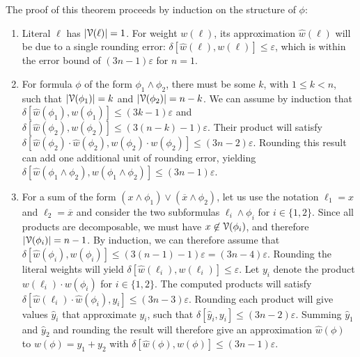 \documentclass[letterpaper,USenglish,cleveref, autoref, thm-restate]{lipics-v2021}
\newcommand{\obar}[1]{\overline{#1}}
\newcommand{\lit}{\ell}
\newcommand{\approximate}[1]{\hat{#1}}
\newcommand{\approxy}{\approximate{y}}
\newcommand{\approxw}{\approximate{w}}
\newcommand{\aerror}{\delta}
\newcommand{\roundepsilon}{\varepsilon}
\newcommand{\dependencyset}{{\cal V}}
\begin{document}
The proof of this theorem proceeds by induction on the structure of $\phi$:
\begin{enumerate}
\item Literal $\lit$ has $|\dependencyset(\lit)| = 1$.  For weight $w(\lit)$, its approximation $\approxw(\lit)$ will be due to a single rounding error:
$\aerror[\approxw(\lit), w(\lit)] \leq \roundepsilon$, which is within the error bound of $(3n-1)\roundepsilon$ for $n=1$.
\item For formula $\phi$ of the form $\phi_1 \land \phi_2$, there must be some $k$, with $1 \leq k < n$, such that $|\dependencyset(\phi_1)| = k$
  and $|\dependencyset(\phi_2)| = n-k$.  We can assume by induction that 
$\aerror[\approxw(\phi_1), w(\phi_1)] \leq (3 k-1) \roundepsilon$
  and $\aerror[\approxw(\phi_2), w(\phi_2)] \leq (3 (n-k)-1) \roundepsilon$.  Their product
  will satisfy 
  $\aerror[\approxw(\phi_2) \cdot \approxw(\phi_2), w(\phi_2) \cdot w(\phi_2)] \leq (3 n -2) \roundepsilon$.
  Rounding this result can add one additional unit of rounding error, yielding
$\aerror[\approxw(\phi_1 \land \phi_2), w(\phi_1 \land \phi_2)] \leq (3 n -1) \roundepsilon$.
\item For a sum of the form
  $(x \land \phi_1) \lor (\obar{x} \land \phi_2)$, let us use the notation $\lit_1 = x$ and $\lit_2 = \obar{x}$
  and consider the two subformulas $\lit_i \land \phi_i$ for $i \in \{1,2\}$.
  Since all products are decomposable, we must have $x \not \in \dependencyset(\phi_i)$,
  and therefore $|\dependencyset(\phi_i)| = n-1$.
  By induction, we can therefore assume that
  $\aerror[\approxw(\phi_i), w(\phi_i)] \leq (3(n-1)-1) \roundepsilon = (3n-4)\roundepsilon$.  Rounding the literal weights will yield
  $\aerror[\approxw(\lit_i), w(\lit_i)] \leq \roundepsilon$.  Let $y_i$ denote the product $w(\lit_i) \cdot w(\phi_i)$ for $i \in \{1,2\}$.
  The computed products will satisfy
  $\aerror[\approxw(\lit_i) \cdot \approxw(\phi_i), y_i] \leq (3n-3) \roundepsilon$.
  Rounding each product will give values $\approxy_i$ that approximate $y_i$, such that
  $\aerror[\approxy_i, y_i] \leq (3n-2) \roundepsilon$.  Summing $\approxy_1$ and $\approxy_2$ and rounding the result will therefore give
  an approximation $\approxw(\phi)$ to $w(\phi) = y_1 + y_2$ with
$\aerror[\approxw(\phi), w(\phi)] \leq (3n-1)\roundepsilon$.  
\end{enumerate}
\end{document}
